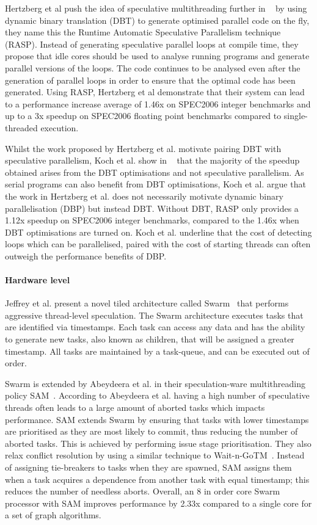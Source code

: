 Hertzberg et al push the idea of speculative multithreading further in ~\cite{dbtspec2011} by using dynamic binary translation (DBT) to generate optimised parallel code on the fly, they name this the Runtime Automatic Speculative Parallelism technique (RASP).
Instead of generating speculative parallel loops at compile time, they propose that idle cores should be used to analyse running programs and generate parallel versions of the loops.
The code continues to be analysed even after the generation of parallel loops in order to ensure that the optimal code has been generated.
Using RASP, Hertzberg et al demonstrate that their system can lead to a performance increase average of 1.46x on SPEC2006 integer benchmarks and up to a 3x speedup on SPEC2006 floating point benchmarks compared to single-threaded execution.

Whilst the work proposed by Hertzberg et al. motivate pairing DBT with speculative parallelism, Koch et al. show in ~\cite{koch2013spec} that the majority of the speedup obtained arises from the DBT optimisations and not speculative parallelism.
As serial programs can also benefit from DBT optimisations, Koch et al. argue that the work in Hertzberg et al. does not necessarily motivate dynamic binary parallelisation (DBP) but instead DBT.
Without DBT, RASP only provides a 1.12x speedup on SPEC2006 integer benchmarks, compared to the 1.46x when DBT optimisations are turned on.
Koch et al. underline that the cost of detecting loops which can be parallelised, paired with the cost of starting threads can often outweigh the performance benefits of DBP.
 
\paragraph*{Hardware level}
Jeffrey et al. present a novel tiled architecture called Swarm~\cite{swarm2016} that performs aggressive thread-level speculation.
The Swarm architecture executes tasks that are identified via timestamps.
Each task can access any data and has the ability to generate new tasks, also known as children, that will be assigned a greater timestamp.
All tasks are maintained by a task-queue, and can be executed out of order.

Swarm is extended by Abeydeera et al. in their speculation-ware multithreading policy SAM~\cite{Abeydeera2017SpecMulti}.
According to Abeydeera et al. having a high number of speculative threads often leads to a large amount of aborted tasks which impacts performance.
SAM extends Swarm by ensuring that tasks with lower timestamps are prioritised as they are most likely to commit, thus reducing the number of aborted tasks.
This is achieved by performing issue stage prioritisation.
They also relax conflict resolution by using a similar technique to Wait-n-GoTM~\cite{waitNGo2013}.
Instead of assigning tie-breakers to tasks when they are spawned, SAM assigns them when a task acquires a dependence from another task with equal timestamp; this reduces the number of needless aborts.
Overall, an 8 in order core Swarm processor with SAM improves performance by 2.33x compared to a single core for a set of graph algorithms.

